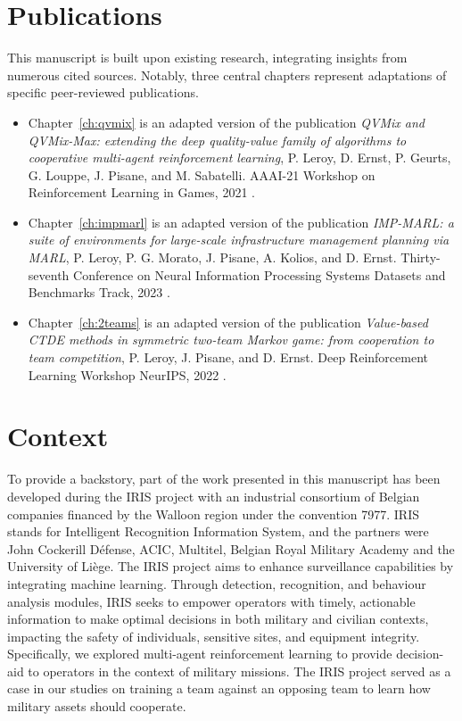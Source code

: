 \section{Publications}
\label{sec:ch1_publications}

This manuscript is built upon existing research, integrating insights from numerous cited sources.
Notably, three central chapters represent adaptations of specific peer-reviewed publications.

\begin{itemize}
\item Chapter~\ref{ch:qvmix} is an adapted version of the publication \textit{QVMix and QVMix-Max: extending the deep quality-value family of algorithms to cooperative multi-agent reinforcement learning}, P. Leroy, D. Ernst, P. Geurts, G. Louppe, J. Pisane, and M. Sabatelli. AAAI-21 Workshop on Reinforcement Learning in Games, 2021 \citep{leroy2020qvmix}.

\item Chapter~\ref{ch:impmarl} is an adapted version of the publication \textit{IMP-MARL: a suite of environments for large-scale infrastructure management planning via MARL}, P. Leroy, P. G. Morato, J. Pisane, A. Kolios, and D. Ernst. Thirty-seventh Conference on Neural Information Processing Systems Datasets and Benchmarks Track, 2023 \citep{leroy2023impmarl}.

\item Chapter~\ref{ch:2teams} is an adapted version of the publication \textit{Value-based CTDE methods in symmetric two-team Markov game: from cooperation to team competition}, P. Leroy, J. Pisane, and D. Ernst. Deep Reinforcement Learning Workshop NeurIPS, 2022 \citep{leroy2022twoteam}.
\end{itemize}


\section{Context}
\label{sec:ch1_context}
To provide a backstory, part of the work presented in this manuscript has been developed during the IRIS project with an industrial consortium of Belgian companies financed by the Walloon region under the convention 7977.
IRIS stands for Intelligent Recognition Information System, and the partners were John Cockerill D{\'{e}}fense, ACIC, Multitel, Belgian Royal Military Academy and the University of Li{\`{e}}ge.
The IRIS project aims to enhance surveillance capabilities by integrating machine learning.
Through detection, recognition, and behaviour analysis modules, IRIS seeks to empower operators with timely, actionable information to make optimal decisions in both military and civilian contexts, impacting the safety of individuals, sensitive sites, and equipment integrity.
Specifically, we explored multi-agent reinforcement learning to provide decision-aid to operators in the context of military missions.
The IRIS project served as a case in our studies on training a team against an opposing team to learn how military assets should cooperate.
